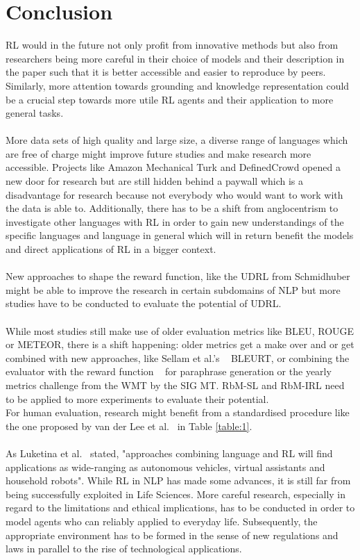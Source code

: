 \documentclass[11pt]{article}
\begin{document}
\section{Conclusion}\label{conclusion}
RL would in the future not only profit from innovative methods but also from researchers being more careful in their choice of models and their description in the paper such that it is better accessible and easier to reproduce by peers. Similarly, more attention towards grounding and knowledge representation could be a crucial step towards more utile RL agents and their application to more general tasks.\\\\
More data sets of high quality and large size, a diverse range of languages which are free of charge might improve future studies and make research more accessible. Projects like Amazon Mechanical Turk and DefinedCrowd opened a new door for research but are still hidden behind a paywall which is a disadvantage for research because not everybody who would want to work with the data is able to. Additionally, there has to be a shift from anglocentrism to investigate other languages with RL in order to gain new understandings of the specific languages and language in general which will in return benefit the models and direct applications of RL in a bigger context.\\\\
New approaches to shape the reward function, like the UDRL from Schmidhuber~ might be able to improve the research in certain subdomains of NLP but more studies have to be conducted to evaluate the potential of UDRL.\\\\
While most studies still make use of older evaluation metrics like BLEU, ROUGE or METEOR, there is a shift happening: older metrics get a make over and or get combined with new approaches, like Sellam et al.'s ~ BLEURT, or combining the evaluator with the reward function ~\cite{li-etal-2018-paraphrase} for paraphrase generation or the yearly metrics challenge from the WMT by the SIG MT. RbM-SL and RbM-IRL need to be applied to more experiments to evaluate their potential.\\
For human evaluation, research might benefit from a standardised procedure like the one proposed by van der Lee et al.~ in Table \ref{table:1}.\\\\
As Luketina et al.~ stated, "approaches combining language and RL will find applications as wide-ranging as autonomous vehicles, virtual assistants and household robots". While RL in NLP has made some advances, it is still far from being successfully exploited in Life Sciences. More careful research, especially in regard to the limitations and ethical implications, has to be conducted in order to model agents who can reliably applied to everyday life. Subsequently, the appropriate environment has to be formed in the sense of new regulations and laws in parallel to the rise of technological applications. 

\newpage


\end{document}
